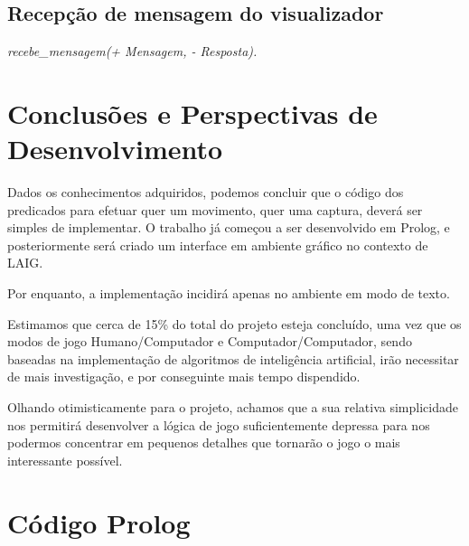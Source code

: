 \documentclass[15pt,a4paper]{article}
\begin{document}
\subsection{Recepção de mensagem do visualizador}\textit{recebe\_mensagem(+ Mensagem, - Resposta).}


\newpage

\section{Conclusões e Perspectivas de Desenvolvimento}


Dados os conhecimentos adquiridos, podemos concluir que o código dos predicados para efetuar quer um movimento, quer uma captura, deverá ser simples de implementar. 
O trabalho já começou a ser desenvolvido em Prolog, e posteriormente será criado um interface em ambiente gráfico no contexto de LAIG.

Por enquanto, a implementação incidirá apenas no ambiente em modo de texto.

Estimamos que cerca de 15\% do total do projeto esteja concluído, uma vez que os modos de jogo Humano/Computador e Computador/Computador, sendo baseadas na implementação de algoritmos de inteligência artificial, irão necessitar de mais investigação, e por conseguinte mais tempo dispendido.

Olhando otimisticamente para o projeto, achamos que a sua relativa simplicidade nos permitirá desenvolver a lógica de jogo suficientemente depressa para nos podermos concentrar em pequenos detalhes que tornarão o jogo o mais interessante possível.



\clearpage

\renewcommand\refname{Bibliografia}



\nocite{breakSite}
\nocite{tut1}
\nocite{tut2}


\newpage

\appendix
\section{Código Prolog}
\end{document}
